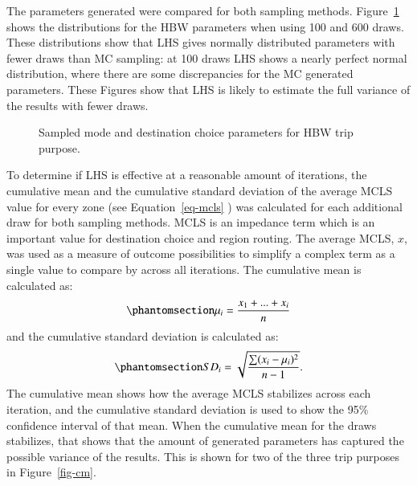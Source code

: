 \documentclass[
  letterpaper,
  number,
  review,
  3p]{elsarticle}
\begin{document}
The parameters generated were compared for both sampling methods.
Figure~\ref{fig-parameter} shows the distributions for the HBW
parameters when using 100 and 600 draws. These distributions show that
LHS gives normally distributed parameters with fewer draws than MC
sampling: at 100 draws LHS shows a nearly perfect normal distribution,
where there are some discrepancies for the MC generated parameters.
These Figures show that LHS is likely to estimate the full variance of
the results with fewer draws.

\begin{figure}

\begin{minipage}{\linewidth}



\end{minipage}%
\newline
\begin{minipage}{\linewidth}



\end{minipage}%

\caption{\label{fig-parameter}Sampled mode and destination choice
parameters for HBW trip purpose.}

\end{figure}%

To determine if LHS is effective at a reasonable amount of iterations,
the cumulative mean and the cumulative standard deviation of the average
MCLS value for every zone (see Equation~\ref{eq-mcls} ) was calculated
for each additional draw for both sampling methods. MCLS is an impedance
term which is an important value for destination choice and region
routing. The average MCLS, \(x\), was used as a measure of outcome
possibilities to simplify a complex term as a single value to compare by
across all iterations. The cumulative mean is calculated as:
\begin{equation}\phantomsection\label{eq-cmclsmean}{
\mu_i = \frac{x_1 + ... + x_i}{n}
}\end{equation} and the cumulative standard deviation is calculated as:
\begin{equation}\phantomsection\label{eq-sdi}{
SD_i = \sqrt{\frac{\sum (x_i - \mu_i)^2 }{n-1}}.
}\end{equation} The cumulative mean shows how the average MCLS
stabilizes across each iteration, and the cumulative standard deviation
is used to show the 95\% confidence interval of that mean. When the
cumulative mean for the draws stabilizes, that shows that the amount of
generated parameters has captured the possible variance of the results.
This is shown for two of the three trip purposes in Figure~\ref{fig-cm}.
\end{document}
